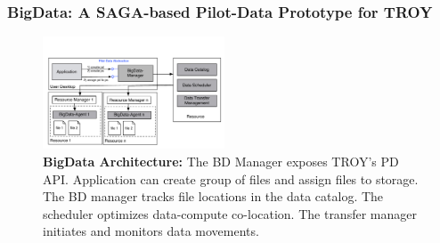 \subsubsection*{BigData: A SAGA-based Pilot-Data Prototype for TROY}
\label{sec:bigdata}

\begin{figure}[t]
    \centering
    \includegraphics[width=0.48\textwidth]{figures/pilot-data-manager.pdf}
    \caption{\textbf{BigData Architecture:} The BD Manager exposes
      TROY's PD API. Application can create group of files and assign 
      files to storage. The BD manager tracks file locations in
      the data catalog. The scheduler optimizes data-compute co-location.
      The transfer manager initiates and monitors data movements. \up\up}
    \label{fig:pilot-data-architecture}
\end{figure}



